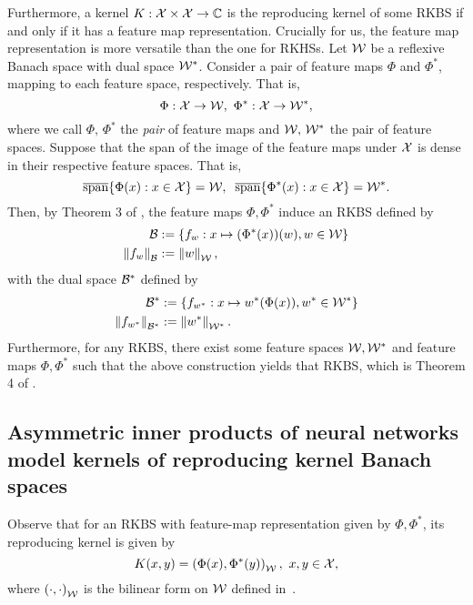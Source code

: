 Furthermore, a kernel $K: {\mathcal{X}} \times {\mathcal{X}} \to {\mathbb{C}}$ is the reproducing kernel of some RKBS if and only if it has a feature map representation. Crucially for us, the feature map representation is more versatile than the one for RKHSs. Let ${\mathcal{W}}$ be a reflexive Banach space with dual space ${\mathcal{W}}^*$. Consider a pair of feature maps $\Phi$ and $\Phi^*$, mapping to each feature space, respectively. That is,
\begin{equation*}
    \Phi: \calX \to \calW, \ \Phi^*: \calX \to \calW^*,
\end{equation*}
where we call $\Phi,\, \Phi^*$ the \textit{pair} of feature maps and ${\mathcal{W}},\, {\mathcal{W}}^*$ the pair of feature spaces. Suppose that the span of the image of the feature maps under ${\mathcal{X}}$ is dense in their respective feature spaces. That is,
\begin{equation}
    \overline{\text{span}}\{\Phi(x): x \in \calX\} = \calW, \;\; \overline{\text{span}}\{\Phi^*(x): x \in \calX\} = \calW^*.
\end{equation}
Then, by Theorem 3 of \citet{zhangReproducingKernel2009}, the feature maps $\Phi, \Phi^*$ induce an RKBS defined by
\begin{align}
    \calB &:= \set{f_w: x \mapsto (\Phi^*(x))(w), w \in \calW} \\
    \norm{f_w}_\calB &:= \norm{w}_\calW,
\end{align}
with the dual space ${\mathcal{B}}^*$ defined by
\begin{align}
    \calB^* &:= \set{f_{w^*}: x \mapsto w^*(\Phi(x)), w^* \in \calW^*} \\
    \norm{f_{w^*}}_{\calB^*} &:= \norm{w^*}_{\calW^*}.
\end{align}
Furthermore, for any RKBS, there exist some feature spaces ${\mathcal{W}}, {\mathcal{W}}^*$ and feature maps $\Phi, \Phi^*$ such that the above construction yields that RKBS, which is Theorem 4 of \citet{zhangReproducingKernel2009}.

\subsection{Asymmetric inner products of neural networks model kernels of reproducing kernel Banach spaces}

Observe that for an RKBS with feature-map representation given by $\Phi, \Phi^*$, its reproducing kernel is given by
\begin{equation}
    K(x, y) = \paren{\Phi(x), \Phi^*(y)}_{\calW}, \ x, y \in \calX,
\end{equation}
where $\left(\cdot, \cdot\right)_{{\mathcal{W}}}$ is the bilinear form on ${\mathcal{W}}$ defined in~.

